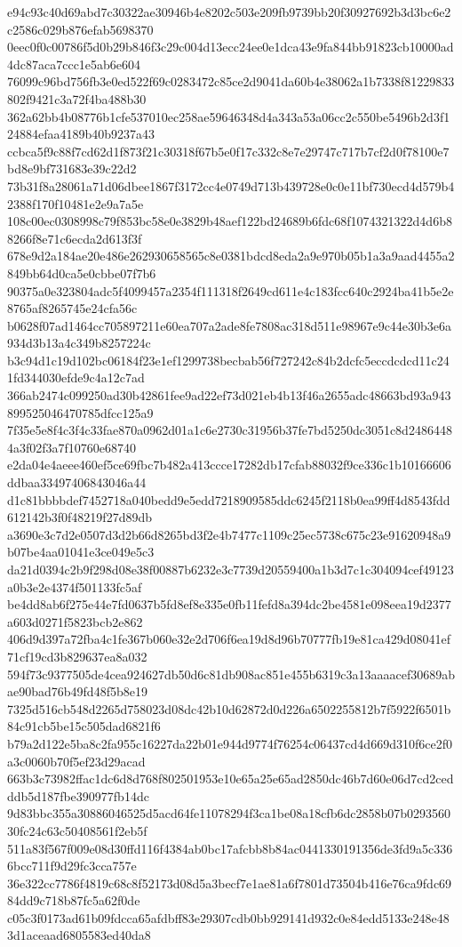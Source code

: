 {e94c93c40d69abd7c30322ae30946b4e8202c503e209fb9739bb20f30927692b3d3bc6e2c2586c029b876efab5698370
0eec0f0c00786f5d0b29b846f3c29c004d13ecc24ee0e1dca43e9fa844bb91823cb10000ad4dc87aca7ccc1e5ab6e604
76099c96bd756fb3e0ed522f69c0283472c85ce2d9041da60b4e38062a1b7338f81229833802f9421c3a72f4ba488b30
362a62bb4b08776b1cfe537010ec258ae59646348d4a343a53a06cc2c550be5496b2d3f124884efaa4189b40b9237a43
ccbca5f9c88f7cd62d1f873f21c30318f67b5e0f17c332c8e7e29747c717b7cf2d0f78100e7bd8e9bf731683e39c22d2
73b31f8a28061a71d06dbee1867f3172cc4e0749d713b439728e0c0e11bf730ecd4d579b42388f170f10481e2e9a7a5e
108c00ec0308998c79f853bc58e0e3829b48aef122bd24689b6fdc68f1074321322d4d6b88266f8e71c6ecda2d613f3f
678e9d2a184ae20e486e262930658565c8e0381bdcd8eda2a9e970b05b1a3a9aad4455a2849bb64d0ca5e0cbbe07f7b6
90375a0e323804adc5f4099457a2354f111318f2649cd611e4c183fcc640c2924ba41b5e2e8765af8265745e24cfa56c
b0628f07ad1464cc705897211e60ea707a2ade8fe7808ac318d511e98967e9c44e30b3e6a934d3b13a4c349b8257224c
b3c94d1c19d102bc06184f23e1ef1299738becbab56f727242c84b2dcfc5eccdcdcd11c241fd344030efde9c4a12c7ad
366ab2474c099250ad30b42861fee9ad22ef73d021eb4b13f46a2655adc48663bd93a943899525046470785dfcc125a9
7f35e5e8f4c3f4c33fae870a0962d01a1c6e2730c31956b37fe7bd5250dc3051c8d24864484a3f02f3a7f10760e68740
e2da04e4aeee460ef5ce69fbc7b482a413ccce17282db17cfab88032f9ce336c1b10166606ddbaa33497406843046a44
d1c81bbbbdef7452718a040bedd9e5edd7218909585ddc6245f2118b0ea99ff4d8543fdd612142b3f0f48219f27d89db
a3690e3c7d2e0507d3d2b66d8265bd3f2e4b7477c1109c25ec5738c675c23e91620948a9b07be4aa01041e3ce049e5c3
da21d0394c2b9f298d08e38f00887b6232e3c7739d20559400a1b3d7c1c304094cef49123a0b3e2e4374f501133fc5af
be4dd8ab6f275e44e7fd0637b5fd8ef8e335e0fb11fefd8a394dc2be4581e098eea19d2377a603d0271f5823bcb2e862
406d9d397a72fba4c1fe367b060e32e2d706f6ea19d8d96b70777fb19e81ca429d08041ef71cf19cd3b829637ea8a032
594f73c9377505de4cea924627db50d6c81db908ac851e455b6319c3a13aaaacef30689abae90bad76b49fd48f5b8e19
7325d516cb548d2265d758023d08dc42b10d62872d0d226a6502255812b7f5922f6501b84c91cb5be15c505dad6821f6
b79a2d122e5ba8c2fa955c16227da22b01e944d9774f76254c06437cd4d669d310f6ce2f0a3c0060b70f5ef23d29acad
663b3c73982ffac1dc6d8d768f802501953e10e65a25e65ad2850dc46b7d60e06d7cd2cedddb5d187fbe390977fb14dc
9d83bbc355a30886046525d5acd64fe11078294f3ca1be08a18cfb6dc2858b07b029356030fc24c63c50408561f2eb5f
511a83f567f009e08d30ffd116f4384ab0bc17afcbb8b84ac0441330191356de3fd9a5c3366bcc711f9d29fc3cca757e
36e322cc7786f4819c68c8f52173d08d5a3becf7e1ae81a6f7801d73504b416e76ca9fdc6984dd9c718b87fc5a62f0de
c05c3f0173ad61b09fdcca65afdbff83e29307cdb0bb929141d932c0e84edd5133e248e483d1aceaad6805583ed40da8
}

